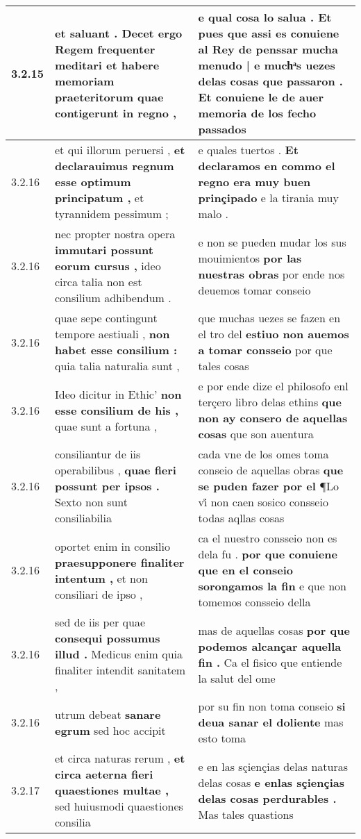 \begin{tabular}{|p{1cm}|p{6.5cm}|p{6.5cm}|}
3.2.15 & et saluant . \textbf{ Decet ergo Regem frequenter meditari et habere memoriam praeteritorum } quae contigerunt in regno , & e qual cosa lo salua . \textbf{ Et pues que assi es conuiene al Rey de penssar mucha menudo | e muchͣs uezes delas cosas que passaron . } Et conuiene le de auer memoria de los fecho passados \\\hline
3.2.16 & et qui illorum peruersi , \textbf{ et declarauimus regnum esse optimum principatum , } et tyrannidem pessimum ; & e quales tuertos . \textbf{ Et declaramos en commo el regno era muy buen prinçipado } e la tirania muy malo . \\\hline
3.2.16 & nec propter nostra opera \textbf{ immutari possunt eorum cursus , } ideo circa talia non est consilium adhibendum . & e non se pueden mudar los sus mouimientos \textbf{ por las nuestras obras } por ende nos deuemos tomar conseio \\\hline
3.2.16 & quae sepe contingunt tempore aestiuali , \textbf{ non habet esse consilium : } quia talia naturalia sunt , & que muchas uezes se fazen en el tro del \textbf{ estiuo non auemos a tomar consseio } por que tales cosas \\\hline
3.2.16 & Ideo dicitur in Ethic’ \textbf{ non esse consilium de his , } quae sunt a fortuna , & e por ende dize el philosofo enl terçero libro delas ethins \textbf{ que non ay consero de aquellas cosas } que son auentura \\\hline
3.2.16 & consiliantur de iis operabilibus , \textbf{ quae fieri possunt per ipsos . } Sexto non sunt consiliabilia & cada vne de los omes toma conseio de aquellas obras \textbf{ que se puden fazer por el } ¶Lo vi̊ non caen sosico consseio todas aqllas cosas \\\hline
3.2.16 & oportet enim in consilio \textbf{ praesupponere finaliter intentum , } et non consiliari de ipso , & ca el nuestro consseio non es dela fu . \textbf{ por que conuiene que en el conseio sorongamos la fin } e que non tomemos consseio della \\\hline
3.2.16 & sed de iis per quae \textbf{ consequi possumus illud . } Medicus enim quia finaliter intendit sanitatem , & mas de aquellas cosas \textbf{ por que podemos alcançar aquella fin . } Ca el fisico que entiende la salut del ome \\\hline
3.2.16 & utrum debeat \textbf{ sanare egrum } sed hoc accipit & por su fin non toma conseio \textbf{ si deua sanar el doliente } mas esto toma \\\hline
3.2.17 & et circa naturas rerum , \textbf{ et circa aeterna fieri quaestiones multae , } sed huiusmodi quaestiones consilia & e en las sçiençias delas naturas delas cosas \textbf{ e enlas sçiençias delas cosas perdurables . } Mas tales quastions \\\hline

\end{tabular}
